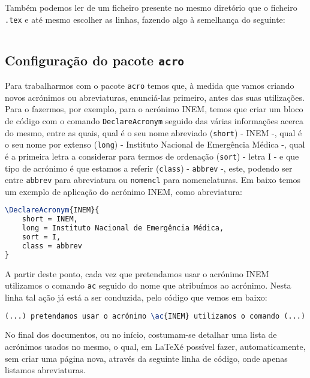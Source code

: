 \documentclass[a4paper, onecolumn, 10pt]{report}
\begin{document}


Também podemos ler de um ficheiro presente no mesmo diretório que o ficheiro \texttt{.tex} e até mesmo escolher as linhas, fazendo algo à semelhança do
seguinte:

\begin{lstlisting}[language=TeX]

\end{lstlisting}

\subsection{Configuração do pacote \texttt{acro}}
Para trabalharmos com o pacote \texttt{acro} temos que, à medida que vamos criando novos acrónimos ou abreviaturas, enunciá-las primeiro, antes das suas
utilizações. Para o fazermos, por exemplo, para o acrónimo INEM, temos que criar um bloco de código com o comando \texttt{DeclareAcronym} seguido das
várias informações acerca do mesmo, entre as quais, qual é o seu nome abreviado (\texttt{short}) - INEM -, qual é o seu nome por extenso (\texttt{long}) -
Instituto Nacional de Emergência Médica -, qual é a primeira letra a considerar para termos de ordenação (\texttt{sort}) - letra I - e que tipo de acrónimo
é que estamos a referir (\texttt{class}) - \texttt{abbrev} -, este, podendo ser entre \texttt{abbrev} para abreviatura ou \texttt{nomencl} para nomenclaturas.
Em baixo temos um exemplo de aplicação do acrónimo INEM, como abreviatura:

\begin{lstlisting}[language=TeX]
\DeclareAcronym{INEM}{
    short = INEM,
    long = Instituto Nacional de Emergência Médica,
    sort = I,
    class = abbrev
}
\end{lstlisting}

A partir deste ponto, cada vez que pretendamos usar o acrónimo \ac{INEM} utilizamos o comando \texttt{ac} seguido do nome que atribuímos ao acrónimo. Nesta linha
tal ação já está a ser conduzida, pelo código que vemos em baixo:

\begin{lstlisting}[language=TeX]
(...) pretendamos usar o acrónimo \ac{INEM} utilizamos o comando (...)
\end{lstlisting}

No final dos documentos, ou no início, costumam-se detalhar uma lista de acrónimos usados no mesmo, o qual, em \LaTeX é possível fazer, automaticamente, sem criar
uma página nova, através da seguinte linha de código, onde apenas listamos abreviaturas.
\end{document}
